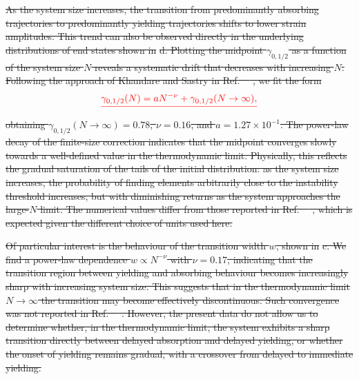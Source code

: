 \documentclass[asymmetricmargins]{library/duthesis}%
\newcommand{\DiffReportBodyFont}{\small}
\newenvironment{DiffReportContent}
  {\begingroup\DiffReportBodyFont}
  {\par\endgroup\medskip}
\providecommand{\DIFdel}[1]{{\protect\color{red}\sout{#1}}}                      %
\providecommand{\DIFdelbegin}{} %
\begin{document}
\begin{DiffReportContent}
\DIFdelbegin \DIFdel{As the system size increases, the transition from predominantly absorbing trajectories to predominantly yielding trajectories shifts to lower strain amplitudes. This trend can also be observed directly in the underlying distributions of end states shown in }%
\DIFdel{d. Plotting the midpoint $\gamma_{0,1/2}$ as a function of the system size $N$ reveals a systematic drift that decreases with increasing $N$. Following the approach of Khandare and Sastry in Ref.~\mbox{%
\cite{khandareElastoplasticModellingCyclic2026}}\hskip0pt%
, we fit the form
}\[
    \DIFdel{\gamma_{0,1/2}(N)=aN^{-\nu}+\gamma_{0,1/2}(N\to\infty),
}\]%
\DIFdel{obtaining $\gamma_{0,1/2}(N\to\infty)=0.78$, $\nu=0.16$, and $a=1.27\times10^{-1}$. The power-law decay of the finite-size correction indicates that the midpoint converges slowly towards a well-defined value in the thermodynamic limit. Physically, this reflects the gradual saturation of the tails of the initial distribution: as the system size increases, the probability of finding elements arbitrarily close to the instability threshold increases, but with diminishing returns as the system approaches the large-$N$ limit. The numerical values differ from those reported in Ref.~\mbox{%
\cite{khandareElastoplasticModellingCyclic2026}}\hskip0pt%
, which is expected given the different choice of units used here.
}%

\DIFdel{Of particular interest is the behaviour of the transition width $w$, shown in }%
\DIFdel{c. We find a power-law dependence $w\propto N^{-\nu}$ with $\nu=0.17$, indicating that the transition region between yielding and absorbing behaviour becomes increasingly sharp with increasing system size. This suggests that in the thermodynamic limit $N\to\infty$ the transition may become effectively discontinuous. Such convergence was not reported in Ref.~\mbox{%
\cite{khandareElastoplasticModellingCyclic2026}}\hskip0pt%
. However, the present data do not allow us to determine whether, in the thermodynamic limit, the system exhibits a sharp transition directly between delayed absorption and delayed yielding, or whether the onset of yielding remains gradual, with a crossover from delayed to immediate yielding.
}%


\end{DiffReportContent}
\end{document}
